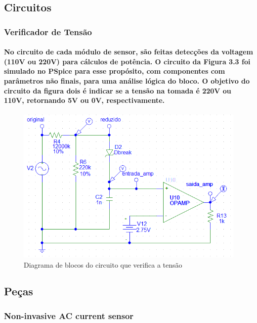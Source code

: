 \subsection{Circuitos}
\subsubsection{Verificador de Tensão}
\paragraph{
No circuito de cada módulo de sensor, são feitas detecções da voltagem (110V ou 220V) para cálculos de potência. O circuito da Figura 3.3 foi simulado no PSpice para esse propósito, com componentes com parâmetros não finais, para uma análise lógica do bloco. O objetivo do circuito da figura dois é indicar se a tensão na tomada é 220V ou 110V, retornando 5V ou 0V, respectivamente.
}
\begin{figure}[H]
\centering
\includegraphics[width=1\textwidth]{figuras/voltage-circuit.png}
\caption{\label{fig:voltage-circuit} Diagrama de blocos do circuito que verifica a tensão}
\end{figure}

\subsection{Peças}
\subsubsection{Non-invasive AC current sensor}
